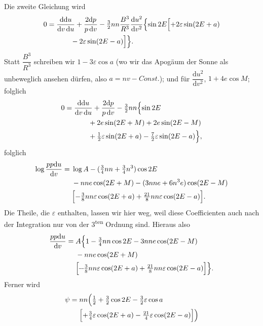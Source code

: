 \clearpage
\begingroup
{}
\renewcommand{\headrulewidth}{0pt}
\par\noindent\hspace*{\parindent}Die zweite Gleichung wird
\[
\begin{aligned}
0={}&\frac{\mathrm{dd}u}{\mathrm{d}v\,\mathrm{d}u}
+\frac{2\mathrm{d}p}{p\,\mathrm{d}v}
-\tfrac32nn\frac{B^3}{R^3}\frac{\mathrm{d}u^2}{\mathrm{d}v^2}\Bigl\{\sin2E\Bigl[+2\varepsilon\sin(2E+a)\\
&\qquad-2\varepsilon\sin(2E-a)\Bigr]\Bigr\}.
\end{aligned}
\]
\noindent Statt \(\dfrac{B^3}{R^3}\) schreiben wir \(1-3\varepsilon\cos a\)
(wo wir das Apogäum der Sonne als unbeweglich ansehen dürfen, also
\(a=nv-\mathit{Const.}\)); und für \(\dfrac{\mathrm{d}u^2}{\mathrm{d}v^2}\),
\(1+4e\cos M\); folglich
\[
\begin{aligned}
0={}&\frac{\mathrm{dd}u}{\mathrm{d}v\,\mathrm{d}u}
+\frac{2\mathrm{d}p}{p\,\mathrm{d}v}-\tfrac32nn\Bigl\{\sin2E\\
&\qquad+2e\sin(2E+M)+2e\sin(2E-M)\\
&\qquad+\tfrac12\varepsilon\sin(2E+a)-\tfrac72\varepsilon\sin(2E-a)\Bigr\},
\end{aligned}
\]
\noindent folglich
\[
\begin{aligned}
\log\frac{pp\mathrm{d}u}{\mathrm{d}v}={}&\log A-(\tfrac34nn+\tfrac34n^3)\cos2E\\
&-nne\cos(2E+M)-(3nne+6n^3e)\cos(2E-M)\\
&\Bigl[-\tfrac38nn\varepsilon\cos(2E+a)
+\tfrac{21}{8}nn\varepsilon\cos(2E-a)\Bigr].
\end{aligned}
\]
\noindent Die Theile, die \(\varepsilon\) enthalten, lassen wir hier weg, weil diese
Coefficienten auch nach der Integration nur von der 3\textsuperscript{ten} Ordnung sind.
Hieraus also
\[
\begin{aligned}
\frac{pp\mathrm{d}u}{\mathrm{d}v}={}&A\Bigl\{1-\tfrac34nn\cos2E-3nne\cos(2E-M)\\
&-nne\cos(2E+M)\\
&\Bigl[\mathbin{\vcenter{\hbox{\rule{.33em}{.04em}\kern.025em\rule{.33em}{.04em}}}}
\tfrac38nn\varepsilon\cos(2E+a)
+\tfrac{21}{8}nn\varepsilon\cos(2E-a)\Bigr]\Bigr\}.
\end{aligned}
\]
\noindent Ferner wird
\[
\begin{aligned}
\psi={}&nn\Bigl(\tfrac12+\tfrac32\cos2E-\tfrac32\varepsilon\cos a\\
&\Bigl[+\tfrac34\varepsilon\cos(2E+a)-\tfrac{21}{4}\varepsilon\cos(2E-a)\Bigr]\Bigr)
\end{aligned}
\]
